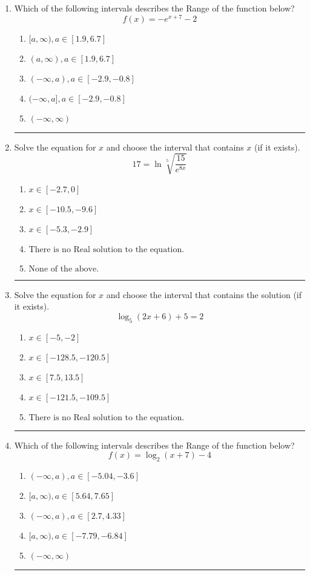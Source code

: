 \documentclass[14pt]{extbook}
\newcommand{\litem}[1]{\item#1\hspace*{-1cm}\rule{\textwidth}{0.4pt}}
\begin{document}
\begin{enumerate}
{\begin{enumerate}[label=\Alph*.]
\end{enumerate} }
\litem{
Which of the following intervals describes the Range of the function below?\[ f(x) = -e^{x+7}-2 \]\begin{enumerate}[label=\Alph*.]
\item \( [a, \infty), a \in [1.9, 6.7] \)
\item \( (a, \infty), a \in [1.9, 6.7] \)
\item \( (-\infty, a), a \in [-2.9, -0.8] \)
\item \( (-\infty, a], a \in [-2.9, -0.8] \)
\item \( (-\infty, \infty) \)

\end{enumerate} }
\litem{
 Solve the equation for $x$ and choose the interval that contains $x$ (if it exists).\[  17 = \ln{\sqrt[5]{\frac{15}{e^{8x}}}} \]\begin{enumerate}[label=\Alph*.]
\item \( x \in [-2.7, 0] \)
\item \( x \in [-10.5, -9.6] \)
\item \( x \in [-5.3, -2.9] \)
\item \( \text{There is no Real solution to the equation.} \)
\item \( \text{None of the above.} \)

\end{enumerate} }
\litem{
Solve the equation for $x$ and choose the interval that contains the solution (if it exists).\[ \log_{5}{(2x+6)}+5 = 2 \]\begin{enumerate}[label=\Alph*.]
\item \( x \in [-5, -2] \)
\item \( x \in [-128.5, -120.5] \)
\item \( x \in [7.5, 13.5] \)
\item \( x \in [-121.5, -109.5] \)
\item \( \text{There is no Real solution to the equation.} \)

\end{enumerate} }
\litem{
Which of the following intervals describes the Range of the function below?\[ f(x) = \log_2{(x+7)}-4 \]\begin{enumerate}[label=\Alph*.]
\item \( (-\infty, a), a \in [-5.04, -3.6] \)
\item \( [a, \infty), a \in [5.64, 7.65] \)
\item \( (-\infty, a), a \in [2.7, 4.33] \)
\item \( [a, \infty), a \in [-7.79, -6.84] \)
\item \( (-\infty, \infty) \)


\end{enumerate}}
\end{enumerate}
\end{document}
